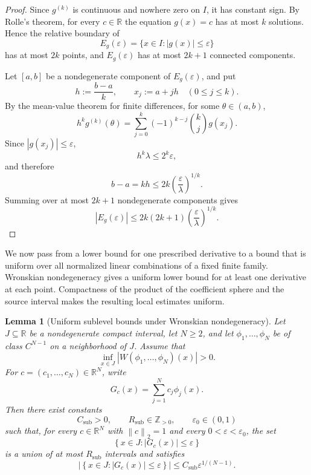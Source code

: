 \documentclass[11pt]{amsart}
\numberwithin{equation}{section}
\newtheorem{lemma}[lemma]{Lemma}
\theoremstyle{definition}
\theoremstyle{remark}
\newcommand{\R}{\mathbb R}
\newcommand{\Z}{\mathbb Z}
\newcommand{\norm}[1]{\left\lVert #1\right\rVert}
\newcommand{\abs}[1]{\left\lvert #1\right\rvert}
\newcommand{\set}[1]{\left\{#1\right\}}
\newcommand{\eps}{\varepsilon}
\begin{document}
\begin{proof}
Since $g^{(k)}$ is continuous and nowhere zero on $I$, it has constant
sign. By Rolle's theorem, for every $c\in\R$ the equation $g(x)=c$
has at most $k$ solutions. Hence the relative boundary of
\[
E_g(\varepsilon)=\{x\in I:|g(x)|\leq\varepsilon\}
\]
has at most $2k$ points, and $E_g(\varepsilon)$ has at most
$2k+1$ connected components.

Let $[a,b]$ be a nondegenerate component of $E_g(\varepsilon)$, and put
\[
h:=\frac{b-a}{k},
\qquad
x_j:=a+jh
\quad(0\leq j\leq k).
\]
By the mean-value theorem for finite differences, for some
$\theta\in(a,b)$,
\[
h^k g^{(k)}(\theta)
=
\sum_{j=0}^k(-1)^{k-j}\binom{k}{j}g(x_j).
\]
Since $|g(x_j)|\leq\varepsilon$,
\[
h^k\lambda
\leq
2^k\varepsilon,
\]
and therefore
\[
b-a=kh
\leq
2k\left(\frac{\varepsilon}{\lambda}\right)^{1/k}.
\]
Summing over at most $2k+1$ nondegenerate components gives
\[
|E_g(\varepsilon)|
\leq
2k(2k+1)
\left(\frac{\varepsilon}{\lambda}\right)^{1/k}.
\]
\end{proof}

We now pass from a lower bound for one prescribed derivative to a
bound that is uniform over all normalized linear combinations of a
fixed finite family. Wronskian nondegeneracy gives a uniform lower bound for at least
one derivative at each point. Compactness of the product of the
coefficient sphere and the source interval makes the resulting
local estimates uniform.

\begin{lemma}[Uniform sublevel bounds under Wronskian nondegeneracy]
\label{lem:uniform-sublevel-en}
Let $J\subseteq\R$ be a nondegenerate compact interval, let $N\geq2$,
and let $\phi_1,\ldots,\phi_N$ be of class $C^{N-1}$ on a neighborhood
of $J$. Assume that
\begin{equation}\label{eq:wronskian-separated-en}
\inf_{x\in J}\abs{W(\phi_1,\ldots,\phi_N)(x)}>0.
\end{equation}
For $c=(c_1,\ldots,c_N)\in\R^N$, write
\[
G_c(x)=\sum_{j=1}^N c_j\phi_j(x).
\]
Then there exist constants
\[
C_{\mathrm{sub}}>0,
\qquad
R_{\mathrm{sub}}\in\Z_{>0},
\qquad
\eps_0\in(0,1)
\]
such that, for every $c\in\R^N$ with $\norm{c}_2=1$ and every
$0<\eps<\eps_0$, the set
\[
\set{x\in J:\abs{G_c(x)}\leq\eps}
\]
is a union of at most $R_{\mathrm{sub}}$ intervals and satisfies
\begin{equation}\label{eq:uniform-sublevel-en}
\left|\set{x\in J:\abs{G_c(x)}\leq\eps}\right|
\leq C_{\mathrm{sub}}\eps^{1/(N-1)}.
\end{equation}
\end{lemma}
\end{document}
